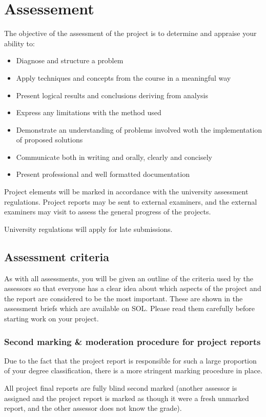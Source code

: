 \chapter{Assessement}

The objective of the assessment of the project is to determine and appraise your ability to:

\begin{itemize}
    \item Diagnose and structure a problem
    \item Apply techniques and concepts from the course in a meaningful way
    \item Present logical results and conclusions deriving from analysis
    \item Express any limitations with the method used
    \item Demonstrate an understanding of problems involved woth the implementation of proposed solutions
    \item Communicate both in writing and orally, clearly and concisely
    \item Present professional and well formatted documentation
\end{itemize}

Project elements will be marked in accordance with the university assessment regulations. Project reports may be sent to external examiners, and the external examiners may visit to assess the general progress of the projects. 

\begin{tcolorbox}
    University regulations will apply for late submissions.
\end{tcolorbox}

\section{Assessment criteria}


As with all assessments, you will be given an outline of the criteria used by the assessors so that everyone has a clear idea about which aspects of the project and the report are considered to be the most important. These are shown in the assessment briefs which are available on SOL. Please read them carefully before starting work on your project.


\subsection{Second marking \& moderation procedure for project reports}

Due to the fact that the project report is responsible for such a large proportion of your degree classification, there is a more stringent marking procedure in place.

All project final reports are fully blind second marked (another assessor is assigned and the project report is marked as though it were a fresh unmarked report, and the other assessor does not know the grade).